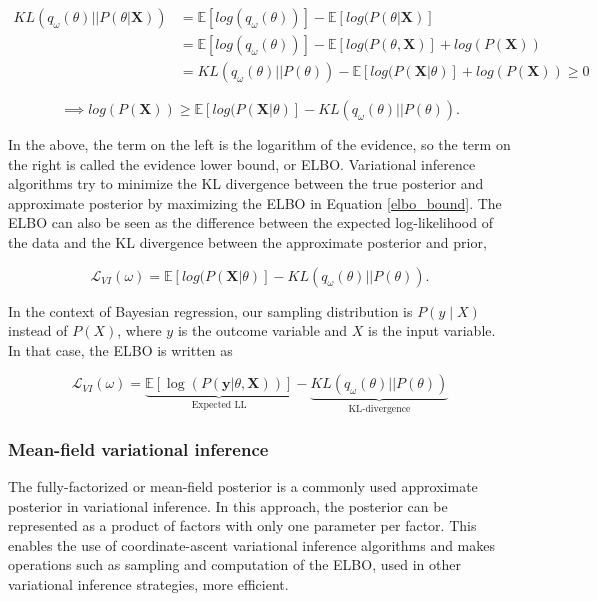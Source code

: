 \begin{align}
    KL(q_{\omega}(\theta)||P(\theta|\textbf{X})) &= \mathbb{E}[log(q_{\omega}(\theta))] -\mathbb{E}[log(P(\theta|\textbf{X})] \nonumber \\
&= \mathbb{E}[log(q_{\omega}(\theta))] -\mathbb{E}[log(P(\theta,\textbf{X})] + log(P(\textbf{X})) \nonumber \\
& = KL(q_{\omega}(\theta)||P(\theta)) -  \mathbb{E}[log(P( \textbf{X}|\theta)] + log(P(\textbf{X})) \geq 0
\end{align} 

\begin{equation}
    \implies log(P(\textbf{X})) \geq \mathbb{E}[log(P( \textbf{X}|\theta)] - KL(q_{\omega}(\theta)||P(\theta)) \label{elbo_bound}.
\end{equation}

%
In the above, the term on the left is the logarithm of the evidence, so the term on the right is called the evidence lower bound, or ELBO.
%
Variational inference algorithms try to minimize the KL divergence between the true posterior and approximate posterior by maximizing the ELBO in Equation \ref{elbo_bound}.
%
The ELBO can also be seen as the difference between the expected log-likelihood of the data and the KL divergence between the approximate posterior and prior,
%

\begin{equation}
    \mathcal{L}_{VI}(\omega) = \mathbb{E}[log(P( \textbf{X}|\theta)] - KL(q_{\omega}(\theta)||P(\theta)).
\end{equation}

%
In the context of Bayesian regression, our sampling distribution is $P(y \mid X)$ instead of $P(X)$, where $y$ is the outcome variable and $X$ is the input variable.
%
In that case, the ELBO is written as

\begin{equation}
    \mathcal{L}_{VI}(\omega) = \underbrace{\mathbb{E}[\log(P( \textbf{y}|\theta, \textbf{X}))]}_{\text{Expected LL}} - \underbrace{KL(q_{\omega}(\theta)||P(\theta))}_{\text{KL-divergence}}
    \label{elbo_blr}
\end{equation}

\subsubsection{Mean-field variational inference}

The fully-factorized or mean-field posterior is a commonly used approximate posterior in variational inference.
%
In this approach, the posterior can be represented as a product of factors with only one parameter per factor.
%
This enables the use of coordinate-ascent variational inference algorithms and makes operations such as sampling and computation of the ELBO, used in other variational inference strategies, more efficient.
%


